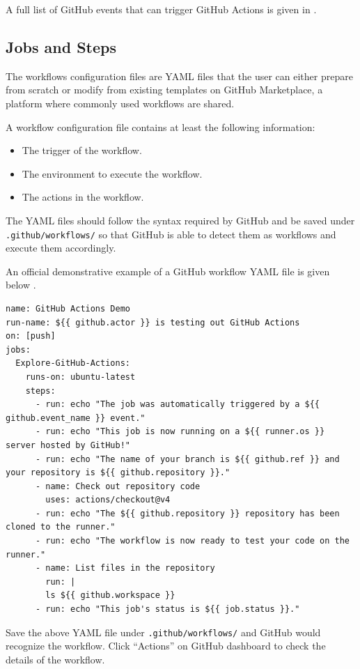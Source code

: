 A full list of GitHub events that can trigger GitHub Actions is given in \cite{git2025reference}.

\subsection{Jobs and Steps}

The workflows configuration files are YAML files that the user can either prepare from scratch or modify from existing templates on GitHub Marketplace, a platform where commonly used workflows are shared.

A workflow configuration file contains at least the following information:
\begin{itemize}
  \item The trigger of the workflow.
  \item The environment to execute the workflow.
  \item The actions in the workflow.
\end{itemize}

The YAML files should follow the syntax required by GitHub and be saved under \verb|.github/workflows/| so that GitHub is able to detect them as workflows and execute them accordingly.

An official demonstrative example of a GitHub workflow YAML file is given below \cite{git2025reference}. 

\begin{lstlisting}
name: GitHub Actions Demo
run-name: ${{ github.actor }} is testing out GitHub Actions
on: [push]
jobs:
  Explore-GitHub-Actions:
    runs-on: ubuntu-latest
	steps:
	  - run: echo "The job was automatically triggered by a ${{ github.event_name }} event."
	  - run: echo "This job is now running on a ${{ runner.os }} server hosted by GitHub!"
	  - run: echo "The name of your branch is ${{ github.ref }} and your repository is ${{ github.repository }}."
	  - name: Check out repository code
		uses: actions/checkout@v4
	  - run: echo "The ${{ github.repository }} repository has been cloned to the runner."
	  - run: echo "The workflow is now ready to test your code on the runner."
	  - name: List files in the repository
	    run: |
		ls ${{ github.workspace }}
	  - run: echo "This job's status is ${{ job.status }}."
\end{lstlisting}

Save the above YAML file under \verb|.github/workflows/| and GitHub would recognize the workflow. Click ``Actions'' on GitHub dashboard to check the details of the workflow.

